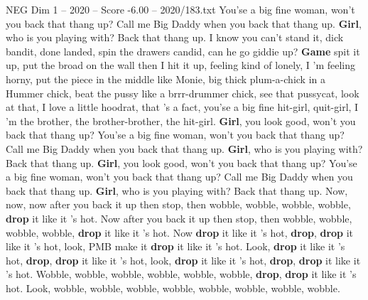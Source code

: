 \begin{textsample}{NEG Dim 1 – 2020 – Score -6.00 – 2020/183.txt}
You'se a big fine woman, won't you back that thang up?
Call me Big Daddy when you back that thang up. \textbf{Girl}, who is you playing with?
Back that thang up.
I know you can't stand it, dick bandit, done landed, spin the drawers candid, can he go giddie up? \textbf{Game} spit it up, put the broad on the wall then I hit it up, feeling kind of lonely, I 'm feeling horny, put the piece in the middle like Monie, big thick plum-a-chick in a Hummer chick, beat the pussy like a brrr-drummer chick, see that pussycat, look at that, I love a little hoodrat, that 's a fact, you'se a big fine hit-girl, quit-girl, I 'm the brother, the brother-brother, the hit-girl. \textbf{Girl}, you look good, won't you back that thang up?
You'se a big fine woman, won't you back that thang up?
Call me Big Daddy when you back that thang up. \textbf{Girl}, who is you playing with?
Back that thang up. \textbf{Girl}, you look good, won't you back that thang up?
You'se a big fine woman, won't you back that thang up?
Call me Big Daddy when you back that thang up. \textbf{Girl}, who is you playing with?
Back that thang up.
Now, now, now after you back it up then stop, then wobble, wobble, wobble, wobble, \textbf{drop} it like it 's hot.
Now after you back it up then stop, then wobble, wobble, wobble, wobble, \textbf{drop} it like it 's hot.
Now \textbf{drop} it like it 's hot, \textbf{drop}, \textbf{drop} it like it 's hot, look, PMB make it \textbf{drop} it like it 's hot.
Look, \textbf{drop} it like it 's hot, \textbf{drop}, \textbf{drop} it like it 's hot, look, \textbf{drop} it like it 's hot, \textbf{drop}, \textbf{drop} it like it 's hot.
Wobble, wobble, wobble, wobble, wobble, wobble, \textbf{drop}, \textbf{drop} it like it 's hot.
Look, wobble, wobble, wobble, wobble, wobble, wobble, wobble, wobble.

\end{textsample}
